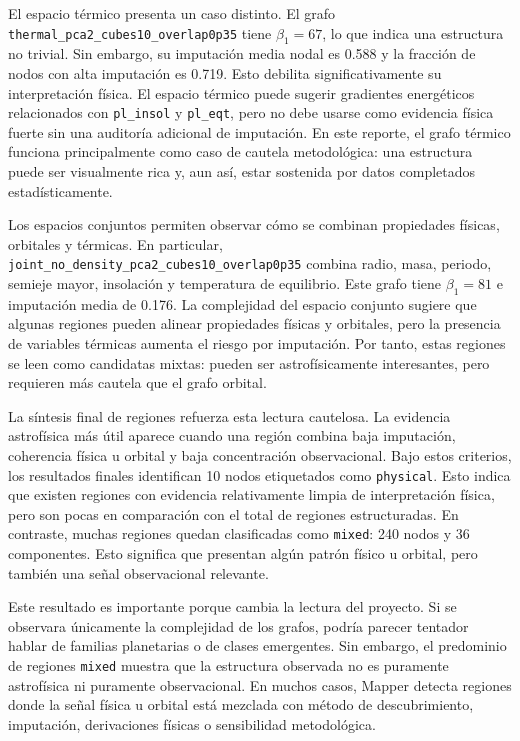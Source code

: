 El espacio térmico presenta un caso distinto. El grafo \texttt{thermal\_pca2\_cubes10\_overlap0p35} tiene \(\beta_1=67\), lo que indica una estructura no trivial. Sin embargo, su imputación media nodal es 0.588 y la fracción de nodos con alta imputación es 0.719. Esto debilita significativamente su interpretación física. El espacio térmico puede sugerir gradientes energéticos relacionados con \texttt{pl\_insol} y \texttt{pl\_eqt}, pero no debe usarse como evidencia física fuerte sin una auditoría adicional de imputación. En este reporte, el grafo térmico funciona principalmente como caso de cautela metodológica: una estructura puede ser visualmente rica y, aun así, estar sostenida por datos completados estadísticamente.

Los espacios conjuntos permiten observar cómo se combinan propiedades físicas, orbitales y térmicas. En particular, \texttt{joint\_no\_density\_pca2\_cubes10\_overlap0p35} combina radio, masa, periodo, semieje mayor, insolación y temperatura de equilibrio. Este grafo tiene \(\beta_1=81\) e imputación media de 0.176. La complejidad del espacio conjunto sugiere que algunas regiones pueden alinear propiedades físicas y orbitales, pero la presencia de variables térmicas aumenta el riesgo por imputación. Por tanto, estas regiones se leen como candidatas mixtas: pueden ser astrofísicamente interesantes, pero requieren más cautela que el grafo orbital.

La síntesis final de regiones refuerza esta lectura cautelosa. La evidencia astrofísica más útil aparece cuando una región combina baja imputación, coherencia física u orbital y baja concentración observacional. Bajo estos criterios, los resultados finales identifican 10 nodos etiquetados como \texttt{physical}. Esto indica que existen regiones con evidencia relativamente limpia de interpretación física, pero son pocas en comparación con el total de regiones estructuradas. En contraste, muchas regiones quedan clasificadas como \texttt{mixed}: 240 nodos y 36 componentes. Esto significa que presentan algún patrón físico u orbital, pero también una señal observacional relevante.

Este resultado es importante porque cambia la lectura del proyecto. Si se observara únicamente la complejidad de los grafos, podría parecer tentador hablar de familias planetarias o de clases emergentes. Sin embargo, el predominio de regiones \texttt{mixed} muestra que la estructura observada no es puramente astrofísica ni puramente observacional. En muchos casos, Mapper detecta regiones donde la señal física u orbital está mezclada con método de descubrimiento, imputación, derivaciones físicas o sensibilidad metodológica.

